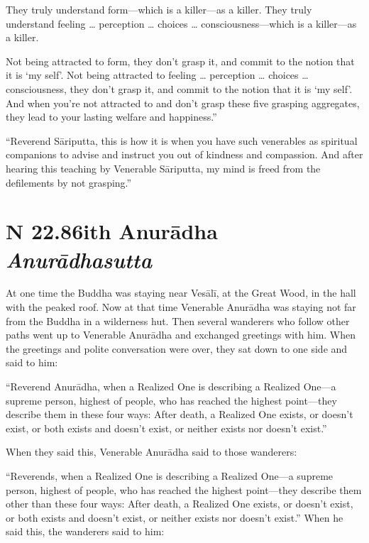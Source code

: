 \documentclass[12pt,openany]{book}%
\newcommand*{\suttatitleacronym}[1]{\smaller[2]{#1}\vspace*{.3em}}
\newcommand*{\suttatitletranslation}[1]{\linebreak{#1}}
\newcommand*{\suttatitleroot}[1]{\linebreak\smaller[2]\itshape{#1}}
\newcommand*{\tocacronym}[1]{\hspace*{-3.3em}{#1}\quad}
\newcommand*{\toctranslation}[1]{#1}
\newcommand*{\tocroot}[1]{(\textit{#1})}
\begin{document}
They truly understand form—which is a killer—as a killer. They truly understand feeling … perception … choices … consciousness—which is a killer—as a killer. 

Not being attracted to form, they don’t grasp it, and commit to the notion that it is ‘my self’. Not being attracted to feeling … perception … choices … consciousness, they don't grasp it, and commit to the notion that it is ‘my self’. And when you’re not attracted to and don’t grasp these five grasping aggregates, they lead to your lasting welfare and happiness.” 

“Reverend \textsanskrit{Sāriputta}, this is how it is when you have such venerables as spiritual companions to advise and instruct you out of kindness and compassion. And after hearing this teaching by Venerable \textsanskrit{Sāriputta}, my mind is freed from the defilements by not grasping.” 

%
\section*{{\suttatitleacronym SN 22.86}{\suttatitletranslation With Anurādha }{\suttatitleroot Anurādhasutta}}
\addcontentsline{toc}{section}{\tocacronym{SN 22.86} \toctranslation{With Anurādha } \tocroot{Anurādhasutta}}

At one time the Buddha was staying near \textsanskrit{Vesālī}, at the Great Wood, in the hall with the peaked roof. Now at that time Venerable \textsanskrit{Anurādha} was staying not far from the Buddha in a wilderness hut. Then several wanderers who follow other paths went up to Venerable \textsanskrit{Anurādha} and exchanged greetings with him. When the greetings and polite conversation were over, they sat down to one side and said to him: 

“Reverend \textsanskrit{Anurādha}, when a Realized One is describing a Realized One—a supreme person, highest of people, who has reached the highest point—they describe them in these four ways: After death, a Realized One exists, or doesn’t exist, or both exists and doesn’t exist, or neither exists nor doesn’t exist.” 

When they said this, Venerable \textsanskrit{Anurādha} said to those wanderers: 

“Reverends, when a Realized One is describing a Realized One—a supreme person, highest of people, who has reached the highest point—they describe them other than these four ways: After death, a Realized One exists, or doesn’t exist, or both exists and doesn’t exist, or neither exists nor doesn’t exist.” When he said this, the wanderers said to him: 
\end{document}
